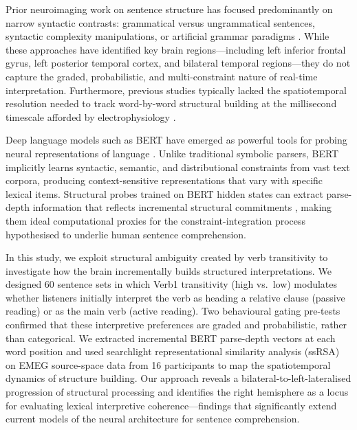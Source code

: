\documentclass[11pt]{article}
\begin{document}
Prior neuroimaging work on sentence structure has focused predominantly on narrow syntactic contrasts: grammatical versus ungrammatical sentences, syntactic complexity manipulations, or artificial grammar paradigms \citep{friederici2011brain, hagoort2014muc}. While these approaches have identified key brain regions---including left inferior frontal gyrus, left posterior temporal cortex, and bilateral temporal regions---they do not capture the graded, probabilistic, and multi-constraint nature of real-time interpretation. Furthermore, previous studies typically lacked the spatiotemporal resolution needed to track word-by-word structural building at the millisecond timescale afforded by electrophysiology \citep{hickok2007cortical}.

Deep language models such as BERT \citep{devlin2019bert} have emerged as powerful tools for probing neural representations of language \citep{schrimpf2021neural, caucheteux2022brains, toneva2019interpreting}. Unlike traditional symbolic parsers, BERT implicitly learns syntactic, semantic, and distributional constraints from vast text corpora, producing context-sensitive representations that vary with specific lexical items. Structural probes trained on BERT hidden states can extract parse-depth information that reflects incremental structural commitments \citep{hewitt2019structural}, making them ideal computational proxies for the constraint-integration process hypothesised to underlie human sentence comprehension.

In this study, we exploit structural ambiguity created by verb transitivity to investigate how the brain incrementally builds structured interpretations. We designed 60 sentence sets in which Verb1 transitivity (high vs.\ low) modulates whether listeners initially interpret the verb as heading a relative clause (passive reading) or as the main verb (active reading). Two behavioural gating pre-tests confirmed that these interpretive preferences are graded and probabilistic, rather than categorical. We extracted incremental BERT parse-depth vectors at each word position and used searchlight representational similarity analysis (ssRSA) on EMEG source-space data from 16 participants to map the spatiotemporal dynamics of structure building. Our approach reveals a bilateral-to-left-lateralised progression of structural processing and identifies the right hemisphere as a locus for evaluating lexical interpretive coherence---findings that significantly extend current models of the neural architecture for sentence comprehension.
\end{document}
